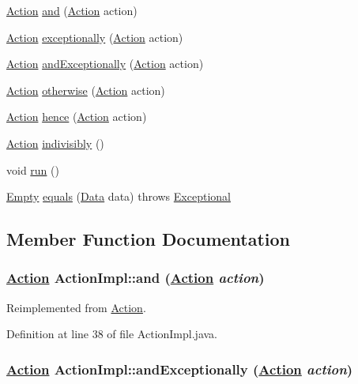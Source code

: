\begin{CompactItemize}
\hyperlink{interfaceAction}{Action} \hyperlink{classActionImpl_a14}{and} (\hyperlink{interfaceAction}{Action} action)
\item 
\hyperlink{interfaceAction}{Action} \hyperlink{classActionImpl_a15}{exceptionally} (\hyperlink{interfaceAction}{Action} action)
\item 
\hyperlink{interfaceAction}{Action} \hyperlink{classActionImpl_a16}{and\-Exceptionally} (\hyperlink{interfaceAction}{Action} action)
\item 
\hyperlink{interfaceAction}{Action} \hyperlink{classActionImpl_a17}{otherwise} (\hyperlink{interfaceAction}{Action} action)
\item 
\hyperlink{interfaceAction}{Action} \hyperlink{classActionImpl_a18}{hence} (\hyperlink{interfaceAction}{Action} action)
\item 
\hyperlink{interfaceAction}{Action} \hyperlink{classActionImpl_a19}{indivisibly} ()
\item 
void \hyperlink{classActionImpl_a20}{run} ()
\item 
\hyperlink{interfaceEmpty}{Empty} \hyperlink{classActionImpl_a21}{equals} (\hyperlink{interfaceData}{Data} data) throws \hyperlink{classExceptional}{Exceptional}
\end{CompactItemize}


\subsection{Member Function Documentation}
\hypertarget{classActionImpl_a14}{
\subsubsection[and]{\setlength{\rightskip}{0pt plus 5cm}\hyperlink{interfaceAction}{Action} Action\-Impl::and (\hyperlink{interfaceAction}{Action} {\em action})}}
\label{classActionImpl_a14}




Reimplemented from \hyperlink{interfaceAction_a4}{Action}.

Definition at line 38 of file Action\-Impl.java.\hypertarget{classActionImpl_a16}{
\subsubsection[andExceptionally]{\setlength{\rightskip}{0pt plus 5cm}\hyperlink{interfaceAction}{Action} Action\-Impl::and\-Exceptionally (\hyperlink{interfaceAction}{Action} {\em action})}}
\label{classActionImpl_a16}




